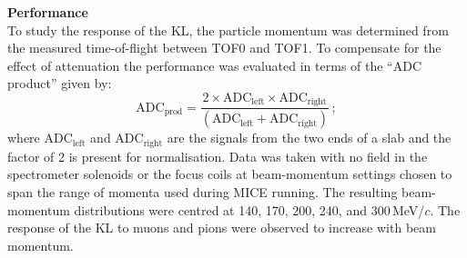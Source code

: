 \noindent\textbf{Performance} \\
\noindent
To study the response of the KL, the particle momentum was determined from the
measured time-of-flight between TOF0 and TOF1.
To compensate for the effect of attenuation the performance was
evaluated in terms of the ``ADC product'' given by:
\begin{equation}
  \text{ADC}_{\text{prod}} = \frac{2 \times
    \text{ADC}_{\text{left}} \times \text{ADC}_{\text{right}}}{
    (\text{ADC}_{\text{left}} + \text{ADC}_{\text{right}})}\,;
\end{equation}
where ADC$_{\text{left}}$ and ADC$_{\text{right}}$ are the signals
from the two ends of a slab and the factor of 2 is present for
normalisation.
Data was taken with no field in the spectrometer solenoids or the
focus coils at beam-momentum settings chosen to span the range of
momenta used during MICE running.
The resulting beam-momentum distributions were centred at 140, 170,
200, 240, and 300\,MeV/$c$.
The response of the KL to muons and pions were observed to increase with
beam momentum.
  
